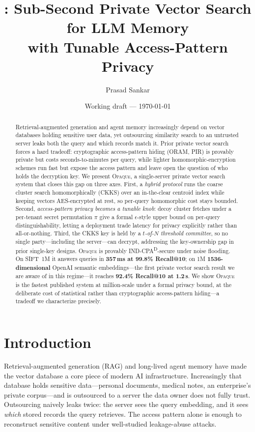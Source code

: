 \documentclass[11pt]{article}
\title{\opaque{}: Sub-Second Private Vector Search for LLM Memory\\
       with Tunable Access-Pattern Privacy}
\author{Prasad Sankar}
\date{Working draft --- \today}
\newcommand{\indcpad}{\mbox{IND-CPA\textsuperscript{D}}}
\newcommand{\opaque}{\textsc{Opaque}}
\begin{document}
\maketitle

\begin{abstract}
Retrieval-augmented generation and agent memory increasingly depend on vector
databases holding sensitive user data, yet outsourcing similarity search to an
untrusted server leaks both the query and which records match it. Prior private
vector search forces a hard tradeoff: cryptographic access-pattern hiding (ORAM,
PIR) is provably private but costs seconds-to-minutes per query, while lighter
homomorphic-encryption schemes run fast but expose the access pattern and leave
open the question of who holds the decryption key. We present \opaque{}, a
single-server private vector search system that closes this gap on three axes.
First, a \emph{hybrid protocol} runs the coarse cluster search homomorphically
(CKKS) over an in-the-clear centroid index while keeping vectors AES-encrypted at
rest, so per-query homomorphic cost stays bounded. Second, \emph{access-pattern
privacy becomes a tunable knob}: decoy cluster fetches under a per-tenant secret
permutation $\pi$ give a formal $\epsilon$-style upper bound on per-query
distinguishability, letting a deployment trade latency for privacy explicitly
rather than all-or-nothing. Third, the CKKS key is held by a \emph{$t$-of-$N$
threshold committee}, so no single party---including the server---can decrypt,
addressing the key-ownership gap in prior single-key designs. \opaque{} is
provably \indcpad{}-secure under noise flooding. On SIFT~1M it answers queries in
\textbf{357\,ms at 99.8\% Recall@10}; on 1M \textbf{1536-dimensional} OpenAI
semantic embeddings---the first private vector search result we are aware of in
this regime---it reaches \textbf{92.4\% Recall@10 at 1.2\,s}. We show \opaque{}
is the fastest published system at million-scale under a formal privacy bound, at
the deliberate cost of statistical rather than cryptographic access-pattern
hiding---a tradeoff we characterize precisely.
\end{abstract}

\section{Introduction}
\label{sec:intro}

Retrieval-augmented generation (RAG) and long-lived agent memory have made the
vector database a core piece of modern AI infrastructure. Increasingly that
database holds sensitive data---personal documents, medical notes, an
enterprise's private corpus---and is outsourced to a server the data owner does
not fully trust. Outsourcing naively leaks twice: the server sees the query
embedding, and it sees \emph{which} stored records the query retrieves. The
access pattern alone is enough to reconstruct sensitive content under
well-studied leakage-abuse attacks.
\end{document}
